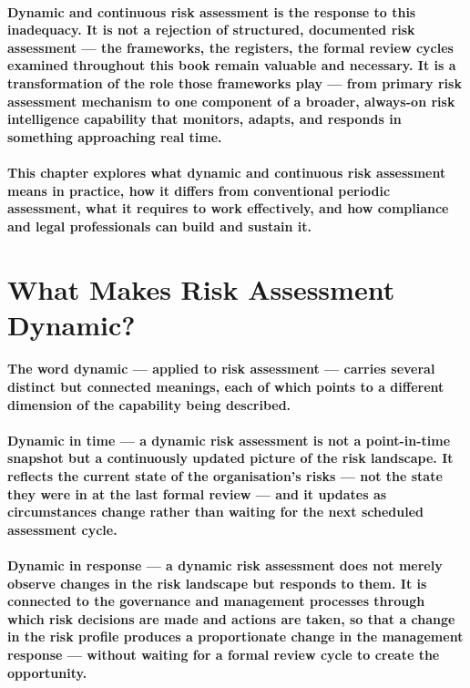 \paragraph{\textbf{Dynamic and continuous risk assessment} is the response to this inadequacy. It is not a rejection of structured, documented risk assessment — the frameworks, the registers, the formal review cycles examined throughout this book remain valuable and necessary. It is a transformation of the role those frameworks play — from primary risk assessment mechanism to one component of a broader, always-on risk intelligence capability that monitors, adapts, and responds in something approaching real time.}
\paragraph{This chapter explores what dynamic and continuous risk assessment means in practice, how it differs from conventional periodic assessment, what it requires to work effectively, and how compliance and legal professionals can build and sustain it.}

\section{What Makes Risk Assessment Dynamic?}
\paragraph{The word \textbf{dynamic} — applied to risk assessment — carries several distinct but connected meanings, each of which points to a different dimension of the capability being described.}
\paragraph{\textbf{Dynamic in time} — a dynamic risk assessment is not a point-in-time snapshot but a continuously updated picture of the risk landscape. It reflects the current state of the organisation's risks — not the state they were in at the last formal review — and it updates as circumstances change rather than waiting for the next scheduled assessment cycle.}
\paragraph{\textbf{Dynamic in response} — a dynamic risk assessment does not merely observe changes in the risk landscape but responds to them. It is connected to the governance and management processes through which risk decisions are made and actions are taken, so that a change in the risk profile produces a proportionate change in the management response — without waiting for a formal review cycle to create the opportunity.}
